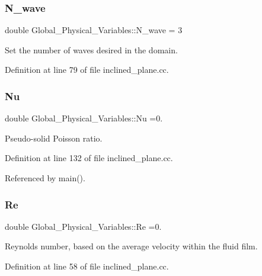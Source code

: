 \subsubsection{\texorpdfstring{N\+\_\+wave}{N\_wave}}
{\footnotesize\ttfamily double Global\+\_\+\+Physical\+\_\+\+Variables\+::\+N\+\_\+wave = 3}



Set the number of waves desired in the domain. 



Definition at line 79 of file inclined\+\_\+plane.\+cc.

\mbox{\label{namespaceGlobal__Physical__Variables_a3962c36313826b19f216f6bbbdd6a477}} 
\subsubsection{\texorpdfstring{Nu}{Nu}}
{\footnotesize\ttfamily double Global\+\_\+\+Physical\+\_\+\+Variables\+::\+Nu =0.}



Pseudo-\/solid Poisson ratio. 



Definition at line 132 of file inclined\+\_\+plane.\+cc.



Referenced by main().

\mbox{\label{namespaceGlobal__Physical__Variables_ab814e627d2eb5bc50318879d19ab16b9}} 
\subsubsection{\texorpdfstring{Re}{Re}}
{\footnotesize\ttfamily double Global\+\_\+\+Physical\+\_\+\+Variables\+::\+Re =0.}



Reynolds number, based on the average velocity within the fluid film. 



Definition at line 58 of file inclined\+\_\+plane.\+cc.



